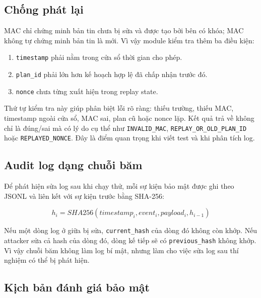 \subsection{Chống phát lại}

MAC chỉ chứng minh bản tin chưa bị sửa và được tạo bởi bên có khóa; MAC không tự chứng minh bản tin là mới. Vì vậy module kiểm tra thêm ba điều kiện:

\begin{enumerate}
  \item \texttt{timestamp} phải nằm trong cửa sổ thời gian cho phép.
  \item \texttt{plan\_id} phải lớn hơn kế hoạch hợp lệ đã chấp nhận trước đó.
  \item \texttt{nonce} chưa từng xuất hiện trong replay state.
\end{enumerate}

Thứ tự kiểm tra này giúp phân biệt lỗi rõ ràng: thiếu trường, thiếu MAC, timestamp ngoài cửa sổ, MAC sai, plan cũ hoặc nonce lặp. Kết quả trả về không chỉ là đúng/sai mà có lý do cụ thể như \texttt{INVALID\_MAC}, \texttt{REPLAY\_OR\_OLD\_PLAN\_ID} hoặc \texttt{REPLAYED\_NONCE}. Đây là điểm quan trọng khi viết test và khi phân tích log.

\subsection{Audit log dạng chuỗi băm}

Để phát hiện sửa log sau khi chạy thử, mỗi sự kiện bảo mật được ghi theo JSONL và liên kết với sự kiện trước bằng SHA-256:

\begin{equation}
h_i = SHA256(timestamp_i, event_i, payload_i, h_{i-1})
\end{equation}

Nếu một dòng log ở giữa bị sửa, \texttt{current\_hash} của dòng đó không còn khớp. Nếu attacker sửa cả hash của dòng đó, dòng kế tiếp sẽ có \texttt{previous\_hash} không khớp. Vì vậy chuỗi băm không làm log bí mật, nhưng làm cho việc sửa log sau thí nghiệm có thể bị phát hiện.

\subsection{Kịch bản đánh giá bảo mật}

